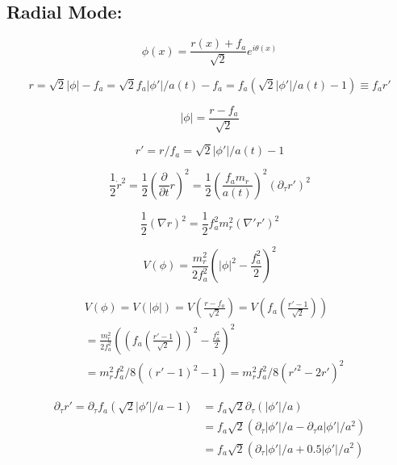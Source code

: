 \documentclass[a4paper]{article}
\begin{document}
\subsection{Radial Mode:}

\begin{equation}
    \phi(x) = \frac{r(x) + f_a}{\sqrt{2}} e^{i \theta(x) }
\end{equation}

\begin{equation}
    r = \sqrt{2} |\phi| - f_a
    = \sqrt{2} f_a |\phi'| / a(t) - f_a
    = f_a \left( \sqrt{2} |\phi'| / a(t) - 1 \right)
    \equiv f_a r'
\end{equation}

\begin{equation}
    |\phi| = \frac{r - f_a}{\sqrt{2}}
\end{equation}

\begin{equation}
    r' = r / f_a = \sqrt{2} |\phi'| / a(t) - 1
\end{equation}

\begin{equation}
    \frac{1}{2} \dot{r}^2 = \frac{1}{2} (\frac{\partial}{\partial t} r)^2
    = \frac{1}{2} (\frac{f_a m_r}{a(t)})^2 \left( \partial_\tau r' \right)^2
\end{equation}

\begin{equation}
    \frac{1}{2} (\nabla r)^2 = \frac{1}{2} f_a^2 m_r^2 ( \nabla' r')^2
\end{equation}

\begin{equation}
    V(\phi) = \frac{m_r^2}{2 f_a^2}\left( |\phi|^2 - \frac{f_a^2}{2} \right)^2
\end{equation}

\begin{align}
    &V(\phi) = V(|\phi|) = V(\frac{r - f_a}{\sqrt{2}})
    = V \left(f_a \left( \frac{r' - 1}{\sqrt{2}} \right) \right) \\
    &= \frac{m_r^2}{2 f_a^2}\left( \left(f_a \left( \frac{r' - 1}{\sqrt{2}} \right) \right)^2 - \frac{f_a^2}{2} \right)^2 \\
    &= m_r^2 f_a^2 / 8 ( (r' - 1)^2 - 1)
    = m_r^2 f_a^2 / 8 ( r'^2 - 2 r' )^2
\end{align}

\begin{align}
    \partial_\tau r' = \partial_\tau f_a \left( \sqrt{2} |\phi'| / a - 1 \right)
    &= f_a \sqrt{2} \partial_\tau ( |\phi'| / a ) \\
    &= f_a \sqrt{2} (\partial_\tau |\phi'| / a - \partial_\tau a |\phi'| / a^2) \\
    &= f_a \sqrt{2} (\partial_\tau |\phi'| / a + 0.5 |\phi'| / a^2)
\end{align}
\end{document}
